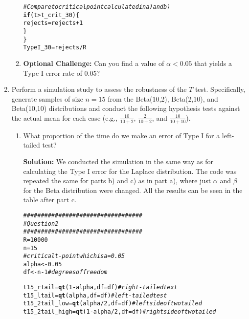 \documentclass{article}\usepackage[]{graphicx}\usepackage[]{xcolor}
\makeatletter
\newcommand{\hlnum}[1]{\textcolor[rgb]{0.686,0.059,0.569}{#1}}%
\newcommand{\hlcom}[1]{\textcolor[rgb]{0.678,0.584,0.686}{\textit{#1}}}%
\newcommand{\hlopt}[1]{\textcolor[rgb]{0,0,0}{#1}}%
\newcommand{\hldef}[1]{\textcolor[rgb]{0.345,0.345,0.345}{#1}}%
\newcommand{\hlkwa}[1]{\textcolor[rgb]{0.161,0.373,0.58}{\textbf{#1}}}%
\newcommand{\hlkwb}[1]{\textcolor[rgb]{0.69,0.353,0.396}{#1}}%
\newcommand{\hlkwc}[1]{\textcolor[rgb]{0.333,0.667,0.333}{#1}}%
\newcommand{\hlkwd}[1]{\textcolor[rgb]{0.737,0.353,0.396}{\textbf{#1}}}%
\newenvironment{kframe}{%
 \def\at@end@of@kframe{}%
 \ifinner\ifhmode%
  \def\at@end@of@kframe{\end{minipage}}%
  \begin{minipage}{\columnwidth}%
 \fi\fi%
 \def\FrameCommand##1{\hskip\@totalleftmargin \hskip-\fboxsep
 \colorbox{shadecolor}{##1}\hskip-\fboxsep
     \hskip-\linewidth \hskip-\@totalleftmargin \hskip\columnwidth}%
 \MakeFramed {\advance\hsize-\width
   \@totalleftmargin\z@ \linewidth\hsize
   \@setminipage}}%
 {\par\unskip\endMakeFramed%
 \at@end@of@kframe}
\newenvironment{knitrout}{}{} %
\makeatother
\begin{document}
\begin{enumerate}
\begin{enumerate}
\begin{knitrout}
\begin{kframe}
\begin{alltt}
\hlcom{#Compare to critical point calculated in a) and b)}
\hlkwa{if} \hldef{(t} \hlopt{>} \hldef{t_crit_30)\{}
  \hldef{rejects} \hlkwb{=} \hldef{rejects} \hlopt{+} \hlnum{1}
\hldef{\}}
\hldef{\}}
\hldef{TypeI_30} \hlkwb{=} \hldef{rejects}\hlopt{/}\hldef{R}
\end{alltt}
\end{kframe}
\end{knitrout}
  \item \textbf{Optional Challenge:} Can you find a value of $\alpha<0.05$ that yields a 
  Type I error rate of 0.05?
\end{enumerate}
  \item Perform a simulation study to assess the robustness of the $T$ test. 
  Specifically, generate samples of size $n=15$ from the Beta(10,2), Beta(2,10), 
  and Beta(10,10) distributions and conduct the following hypothesis tests against 
  the actual mean for each case (e.g., $\frac{10}{10+2}$, $\frac{2}{10+2}$, and 
  $\frac{10}{10+10}$). 
  \begin{enumerate}
    \item What proportion of the time do we make an error of Type I for a
    left-tailed test?
    
    \textbf{Solution:} We conducted the simulation in the same way as for calculating the Type I error for the Laplace distribution. The code was repeated the same for parts b) and c) as in part a), where just $\alpha$ and $\beta$ for the Beta distribution were changed. All the results can be seen in the table after part c. 
    
\begin{knitrout}\scriptsize
{}\color{fgcolor}\begin{kframe}
\begin{alltt}
\hlcom{##################################}
\hlcom{# Question 2}
\hlcom{##################################}
\hldef{R} \hlkwb{=} \hlnum{10000}
\hldef{n} \hlkwb{=} \hlnum{15}
\hlcom{#critical t-point which is a = 0.05}
\hldef{alpha} \hlkwb{<-} \hlnum{0.05}
\hldef{df} \hlkwb{<-} \hldef{n} \hlopt{-} \hlnum{1}  \hlcom{# degrees of freedom}

\hldef{t15_rtail} \hlkwb{=} \hlkwd{qt}\hldef{(}\hlnum{1} \hlopt{-} \hldef{alpha,} \hlkwc{df} \hldef{= df)}  \hlcom{#right-tailed text}
\hldef{t15_ltail} \hlkwb{=} \hlkwd{qt}\hldef{(alpha,} \hlkwc{df} \hldef{= df)} \hlcom{#left-tailed test}
\hldef{t15_2tail_low} \hlkwb{=} \hlkwd{qt}\hldef{(alpha}\hlopt{/}\hlnum{2}\hldef{,} \hlkwc{df} \hldef{= df)} \hlcom{# left side of two tailed}
\hldef{t15_2tail_high} \hlkwb{=} \hlkwd{qt}\hldef{(}\hlnum{1} \hlopt{-} \hldef{alpha}\hlopt{/}\hlnum{2}\hldef{,} \hlkwc{df} \hldef{= df)} \hlcom{#right side of two tailed}


\end{alltt}
\end{kframe}
\end{knitrout}
\end{enumerate}
\end{enumerate}
\end{document}
